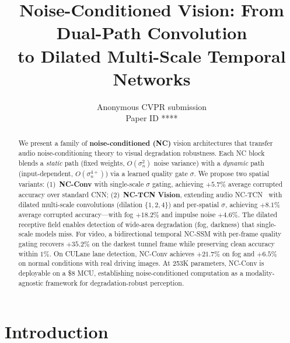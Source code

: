 \documentclass[10pt,twocolumn,letterpaper]{article}
\def\cvprPaperID{****}
\begin{document}
\title{Noise-Conditioned Vision: From Dual-Path Convolution\\to Dilated Multi-Scale Temporal Networks}

\author{Anonymous CVPR submission\\Paper ID \cvprPaperID}

\maketitle

\begin{abstract}
We present a family of \textbf{noise-conditioned (NC)} vision architectures that transfer audio noise-conditioning theory to visual degradation robustness.
Each NC block blends a \textcolor{fixcolor}{\emph{static}} path (fixed weights, $O(\sigma_n^2)$ noise variance) with a \textcolor{dyncolor}{\emph{dynamic}} path (input-dependent, $O(\sigma_n^{4+})$) via a learned quality gate $\sigma$.
We propose two spatial variants:
(1)~\textbf{NC-Conv} with single-scale $\sigma$ gating, achieving $+5.7\%$ average corrupted accuracy over standard CNN;
(2)~\textbf{NC-TCN Vision}, extending audio NC-TCN~\cite{choi2026ncssm} with \textcolor{tcncolor}{dilated multi-scale} convolutions (dilation $\{1,2,4\}$) and per-spatial $\sigma$, achieving $\mathbf{+8.1\%}$ average corrupted accuracy---with fog $+18.2\%$ and impulse noise $+4.6\%$.
The dilated receptive field enables detection of wide-area degradation (fog, darkness) that single-scale models miss.
For video, a \textcolor{tempcolor}{bidirectional temporal NC-SSM} with per-frame quality gating recovers $\mathbf{+35.2\%}$ on the darkest tunnel frame while preserving clean accuracy within $1\%$.
On CULane lane detection, NC-Conv achieves $+21.7\%$ on fog and $+6.5\%$ on normal conditions with real driving images.
At 253K parameters, NC-Conv is deployable on a \$8 MCU, establishing noise-conditioned computation as a modality-agnostic framework for degradation-robust perception.
\end{abstract}

\section{Introduction}
\label{sec:intro}
\end{document}
